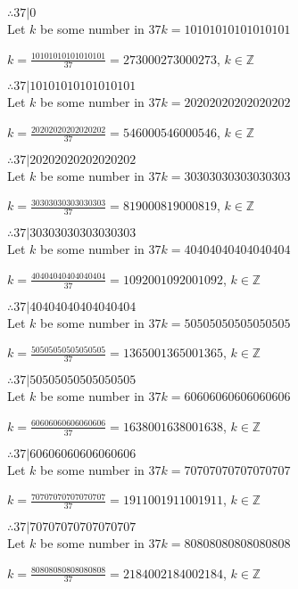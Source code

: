 \documentclass{article}
\begin{document}
$ \therefore  37|0 $ \\

Let $k$ be some number in $37k = 10101010101010101$

$k = \frac{10101010101010101}{37} = 273000273000273$, $k \in \mathbb{Z}$

$ \therefore  37|10101010101010101 $ \\

Let $k$ be some number in $37k = 20202020202020202$

$k = \frac{20202020202020202}{37} = 546000546000546$, $k \in \mathbb{Z}$

$ \therefore  37|20202020202020202 $ \\

Let $k$ be some number in $37k = 30303030303030303$

$k = \frac{30303030303030303}{37} = 819000819000819$, $k \in \mathbb{Z}$

$ \therefore  37|30303030303030303 $ \\

Let $k$ be some number in $37k = 40404040404040404$

$k = \frac{40404040404040404}{37} = 1092001092001092$, $k \in \mathbb{Z}$

$ \therefore  37|40404040404040404 $ \\

Let $k$ be some number in $37k = 50505050505050505$

$k = \frac{50505050505050505}{37} = 1365001365001365$, $k \in \mathbb{Z}$

$ \therefore  37|50505050505050505 $ \\

Let $k$ be some number in $37k = 60606060606060606$

$k = \frac{60606060606060606}{37} = 1638001638001638$, $k \in \mathbb{Z}$

$ \therefore  37|60606060606060606 $ \\

Let $k$ be some number in $37k = 70707070707070707$

$k = \frac{70707070707070707}{37} = 1911001911001911$, $k \in \mathbb{Z}$

$ \therefore  37|70707070707070707 $ \\

Let $k$ be some number in $37k = 80808080808080808$

$k = \frac{80808080808080808}{37} = 2184002184002184$, $k \in \mathbb{Z}$
\end{document}

